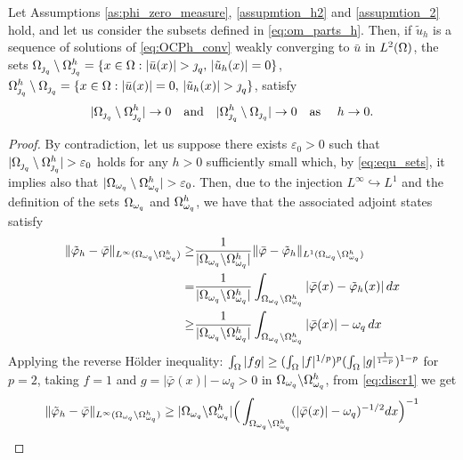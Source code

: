{\begin{lemma}\label{l:om_part_dis}
Let Assumptions \ref{as:phi_zero_measure}, \ref{assupmtion_h2} and \ref{assupmtion_2} hold, and  let us consider the subsets defined in \eqref{eq:om_parts_h}. Then, if $\tilde u_h$ is a sequence of solutions of \eqref{eq:OCPh_conv} weakly converging to $\bar u$ in $L^2(\Omega)$,  the sets ${\om_{\jump_q}}\setminus  {\om^h_{\jump_q}} = \{x\in\om : |\bar u(x)|>\jump_q,  \, |\tilde u_h(x)| =0\}$, ${\Omega^h_{\operatorname{\jmath}_q}\setminus {\Omega_{\operatorname{\jmath}_q}}} = \{x\in\Omega : |\bar u(x)|=0, \, |\tilde u_h(x)| >\operatorname{\jmath}_q\}$,  satisfy
    $$| {\Omega_{\operatorname{\jmath}_q}}\setminus  {\Omega^h_{\operatorname{\jmath}_q}} | \to 0 \quad \text{and}\quad | {\Omega^h_{\operatorname{\jmath}_q}\setminus {\Omega_{\operatorname{\jmath}_q}}} | \to 0 \quad \text{as } \quad h \to 0.$$
\end{lemma}
\begin{proof}
By contradiction, let us suppose  there exists $\varepsilon_0>0$ such that $|{\om_{\jump_q}}\setminus  {\om^h_{\jump_q}}|>\varepsilon_0$  holds for any $h>0$ sufficiently small which,  by \eqref{eq:equ_sets}, it implies also that $|\om_{\omega_q}\setminus \om^h_{\omega_q}|>\varepsilon_0$. Then, due to the injection $L^\infty \hookrightarrow L^1$ and the definition of the sets $\Omega_{\omega_q}$ and $\Omega^h_{\omega_q}$, we have that the associated adjoint states satisfy
\begin{align}
     \|\tilde\varphi_h-\bar\varphi\|_{L^{\infty}(\Omega_{\omega_q} \backslash \Omega^h_{\omega_q})}\geq  &\frac{1}{|\Omega_{\omega_q} \backslash \Omega^h_{\omega_q}|} \|\bar\varphi-\tilde\varphi_h\|_{L^1(\Omega_{\omega_q} \backslash \Omega^h_{\omega_q})} \nonumber\\
      =  & \frac{1}{|\Omega_{\omega_q} \backslash \Omega^h_{\omega_q}|}\int_{\Omega_{\omega_q} \backslash \Omega^h_{\omega_q}} |\bar\varphi(x)-\tilde \varphi_h(x) | \,dx \nonumber\\
      \geq  & \frac{1}{|\Omega_{\omega_q} \backslash \Omega^h_{\omega_q}|}\int_{\Omega_{\omega_q} \backslash \Omega^h_{\omega_q}} |\bar\varphi(x)|-\omega_q \,dx \label{eq:discr1}
 \end{align}
%
Applying the reverse H\"older inequality: $\int_\Omega |fg| \geq (\int_\Omega |f|^{1/p})^p(\int_\Omega |g|^{\frac{1}{1-p}})^{1-p}$ for $p=2$,  taking $f=1$ and $g=|\bar\varphi(x)|-\omega_q >0$ in $\Omega_{\omega_q} \backslash \Omega^h_{\omega_q}$, from \eqref{eq:discr1} we get
%	
\begin{equation}
  \|\tilde\varphi_h-\bar\varphi\|_{L^{\infty}(\om_{\omega_q} \backslash \om^h_{\omega_q})}\geq |\om_{\omega_q} \backslash \om^h_{\omega_q}|\Big(  \int_{\om_{\omega_q} \backslash \om^h_{\omega_q}} (|\bar\varphi(x)| -\omega_q )^{-1/2}dx \Big)^{-1} \nonumber

\end{equation}
\end{proof}}
